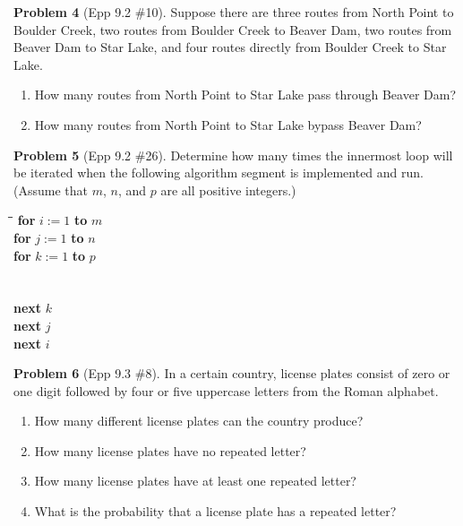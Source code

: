 \documentclass[11pt]{article}
\begin{document}
\noindent\textbf{Problem 4} (Epp 9.2 \#10). \;
Suppose there are three routes from North Point to Boulder Creek, two routes
from Boulder Creek to Beaver Dam, two routes from Beaver Dam to Star Lake,
and four routes directly from Boulder Creek to Star Lake.
\begin{enumerate}[label=\alph*.]
  \item How many routes from North Point to Star Lake pass through Beaver Dam?
  \item How many routes from North Point to Star Lake bypass Beaver Dam?
\end{enumerate}

\bigskip

\noindent\textbf{Problem 5} (Epp 9.2 \#26). \;
Determine how many times the innermost loop will be iterated when the
following algorithm segment is implemented and run.
(Assume that $m$, $n$, and $p$ are all positive integers.)

\medskip
\begin{tabbing}
\quad \= \quad \= \quad \= \kill
\textbf{for} $i := 1$ \textbf{to} $m$ \\
\> \textbf{for} $j := 1$ \textbf{to} $n$ \\
\> \> \textbf{for} $k := 1$ \textbf{to} $p$ \\
\> \>  \\
\> \>  \\
\> \> \textbf{next} $k$ \\
\> \textbf{next} $j$ \\
\textbf{next} $i$
\end{tabbing}

\bigskip

\noindent\textbf{Problem 6} (Epp 9.3 \#8). \;
In a certain country, license plates consist of zero or one digit followed by
four or five uppercase letters from the Roman alphabet.
\begin{enumerate}[label=\alph*.]
  \item How many different license plates can the country produce?
  \item How many license plates have no repeated letter?
  \item How many license plates have at least one repeated letter?
  \item What is the probability that a license plate has a repeated letter?
\end{enumerate}
\end{document}
